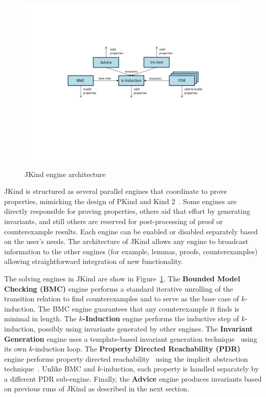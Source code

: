 \documentclass{llncs}
\newcommand{\jkind}{{\sc JKind}\xspace}
\newcommand{\kind}{{\sc Kind}\xspace}
\newcommand{\pkind}{{\sc PKind}\xspace}
\newcommand{\mike}[1]{\textcolor{red}{#1}}
\begin{document}
\begin{figure}[t]
  \begin{center}
    \includegraphics[clip,trim=140 220 80 140,scale=0.6]{engines.png}
  \end{center}
  \vspace{-2em}
  \caption{\jkind engine architecture}
  \vspace{-1em}
  \label{fig:engines}
\end{figure}

\jkind is structured as several parallel engines that coordinate to
prove properties, mimicking the design of \pkind and \kind 2~\cite{champion2016cav, kahsai2011pdmc}.
Some engines are directly responsible for proving properties, others aid that effort by generating invariants, and still others are reserved for post-processing of proof or counterexample results. Each engine can be enabled or disabled separately based on the user's needs. The architecture of \jkind allows any engine to broadcast information to the other engines (for example, lemmas, proofs, counterexamples) allowing straightforward integration of new functionality.

The solving engines in \jkind are show in
Figure~\ref{fig:engines}. The \textbf{Bounded Model Checking (BMC)}
engine performs a standard iterative unrolling of the transition
relation to find counterexamples and to serve as the base case of
$k$-induction. The BMC engine guarantees that any counterexample it
finds is minimal in length. The \textbf{$k$-Induction} engine performs
the inductive step of $k$-induction, possibly using invariants
generated by other engines. The \textbf{Invariant Generation} engine
uses a template-based invariant generation
technique~\cite{kahsai2012nfm} using its own $k$-induction loop. The
\textbf{Property Directed Reachability (PDR)} engine performs property
directed reachability~\cite{een2011fmcad} using the implicit
abstraction technique~\cite{cimatti2014tacas}. Unlike BMC and
$k$-induction, each property is handled separately by a different PDR
sub-engine. Finally, the \textbf{Advice} engine produces invariants
based on previous runs of \jkind as described in the next section.
\end{document}
